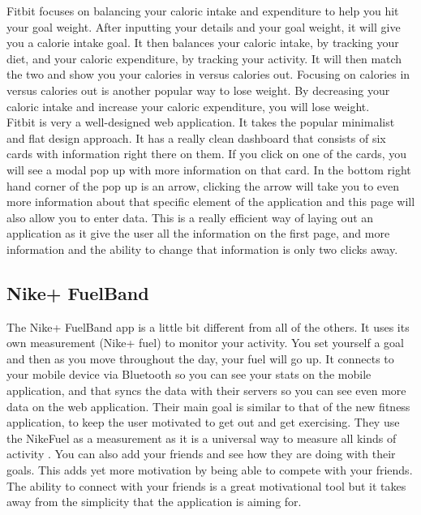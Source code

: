 Fitbit focuses on balancing your caloric intake and expenditure to help you hit your goal weight. After inputting your details and your goal weight, it will give you a calorie intake goal. It then balances your caloric intake, by tracking your diet, and your caloric expenditure, by tracking your activity. It will then match the two and show you your calories in versus calories out. Focusing on calories in versus calories out is another popular way to lose weight. By decreasing your caloric intake and increase your caloric expenditure, you will lose weight.\\

Fitbit is very a well-designed web application. It takes the popular minimalist and flat design approach. It has a really clean dashboard that consists of six cards with information right there on them. If you click on one of the cards, you will see a modal pop up with more information on that card. In the bottom right hand corner of the pop up is an arrow, clicking the arrow will take you to even more information about that specific element of the application and this page will also allow you to enter data. This is a really efficient way of laying out an application as it give the user all the information on the first page, and more information and the ability to change that information is only two clicks away.

\subsection{Nike+ FuelBand}
The Nike+ FuelBand app is a little bit different from all of the others. It uses its own measurement (Nike+ fuel) to monitor your activity. You set yourself a goal and then as you move throughout the day, your fuel will go up. It connects to your mobile device via Bluetooth so you can see your stats on the mobile application, and that syncs the data with their servers so you can see even more data on the web application. Their main goal is similar to that of the new fitness application, to keep the user motivated to get out and get exercising. They use the NikeFuel as a measurement as it is a universal way to measure all kinds of activity \citep{fuelbandpress:2013}. You can also add your friends and see how they are doing with their goals. This adds yet more motivation by being able to compete with your friends. The ability to connect with your friends is a great motivational tool but it takes away from the simplicity that the application is aiming for.

